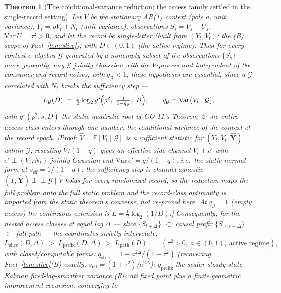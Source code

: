 ﻿\documentclass[11pt]{article}
\newtheorem{theorem}{Theorem}
\theoremstyle{remark}
\begin{document}
\begin{theorem}[The conditional-variance reduction; the access family
settled in the single-record setting]\label{thm:qred}
Let $V$ be the stationary AR(1) context (pole $a$, unit variance),
$Y_t=\rho V_t+N_t$ (unit variance), observations $S_s=V_s+U_s$,
$\mathrm{Var}\,U=\tau^2>0$, and let the record be single-letter (built
from $(Y_t,V_t)$; the (B) scope of Fact~\ref{lem:slice}), with
$D\in(0,1)$ (the active regime). Then for every context
$\sigma$-algebra $\mathcal G$ generated by a \emph{nonempty} subset of
the observations $\{S_s\}$ --- more generally, any $\mathcal G$ jointly
Gaussian with the $V$-process and independent of the consumer and
record noises, with $q_{\mathcal G}<1$; these hypotheses are
essential, since a $\mathcal G$ correlated with $N_t$ breaks the
sufficiency step ---
\[
L_{\mathcal G}(D)\;=\;\tfrac12\log_2
g^\star\!\Bigl(\rho^2,\ \tfrac1{1-q_{\mathcal G}},\ D\Bigr),
\qquad q_{\mathcal G}=\mathrm{Var}\bigl(V_t\mid\mathcal G\bigr),
\]
with $g^\star(\rho^2,s,D)$ the static quadratic root of GO-11's
Theorem~2: the entire access class enters through one number, the
conditional variance of the context at the record epoch.
[Proof: $\hat V=\mathbb E[V_t\mid\mathcal G]$ is a sufficient statistic
for $(Y_t,V_t,\hat{\mathbf Y})$ within $\mathcal G$; rescaling
$\hat V/(1-q)$ gives an effective side channel $V_t+e'$ with
$e'\perp(V_t,N_t)$ jointly Gaussian and
$\mathrm{Var}\,e'=q/(1-q)$, i.e.\ the static normal form at
$s_{\mathrm{eff}}=1/(1-q)$; the sufficiency step is channel-agnostic
--- $(T,\hat{\mathbf Y})\perp\!\!\!\perp\mathcal G\mid\hat V$ holds for
\emph{every} randomized record, so the reduction maps the full problem
onto the full static problem and the record-class optimality is
\emph{imported} from the static theorem's converse, not re-proved
here. At $q_{\mathcal G}=1$ (empty access) the continuous extension is
$L=\tfrac12\log_2(1/D)$.]
Consequently, for the nested access classes at equal lag $\Delta$ ---
slice $\{S_{t+\Delta}\}$ $\subset$ causal prefix $\{S_{\le t+\Delta}\}$
$\subset$ full path --- the coordinates strictly interpolate,
\[
L_{\mathrm{slice}}(D,\Delta)\;>\;L_{\mathrm{prefix}}(D,\Delta)\;>\;
L_{\mathrm{path}}(D)\qquad(\tau^2>0,\ a\in(0,1),\ \text{active regime}),
\]
with closed/computable forms: $q_{\mathrm{slice}}=1-a^{2\Delta}/(1+\tau^2)$
(recovering Fact~\ref{lem:slice}(B) exactly, $s_{\mathrm{eff}}
=(1+\tau^2)/a^{2\Delta}$); $q_{\mathrm{prefix}}$ the scalar
steady-state Kalman fixed-lag-smoother variance (Riccati fixed point
plus a finite geometric improvement recursion, converging to

\end{theorem}
\end{document}
